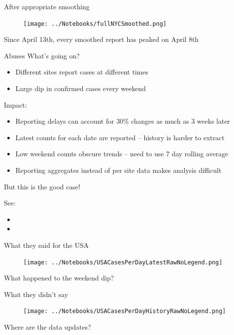 \documentclass[aspectratio=169]{beamer}
\begin{document}
\begin{frame}{After appropriate smoothing}
  \begin{figure}
    \centering
    \texttt{[image: ../Notebooks/fullNYCSmoothed.png]}
  \end{figure}
  Since April 13th, every smoothed report has peaked on April 8th
\end{frame}

\begin{frame}{Abuses}
  What's going on?
  \begin{itemize}
  \item Different sites report cases at different times
  \item Large dip in confirmed cases every weekend
  \end{itemize}
  
  Impact:
  \begin{itemize}
  \item Reporting delays can account for 30\% changes as much as 3
    weeks later
  \item Latest counts for each date are reported -- history is harder
    to extract
  \item Low weekend counts obscure trends -- need to use 7 day rolling
    average
  \item Reporting aggregates instead of per site data makes analysis difficult
  \end{itemize}

But this is the good case!

See:
\begin{itemize}
\item {}
\item {}
\end{itemize}
\end{frame}

\begin{frame}{What they said for the USA}
  \begin{figure}
    \centering
    \texttt{[image: ../Notebooks/USACasesPerDayLatestRawNoLegend.png]}
  \end{figure}
  What happened to the weekend dip?
\end{frame}


\begin{frame}{What they didn't say}
  \begin{figure}
    \centering
    \texttt{[image: ../Notebooks/USACasesPerDayHistoryRawNoLegend.png]}
  \end{figure}
  Where are the data updates?
\end{frame}
\end{document}
